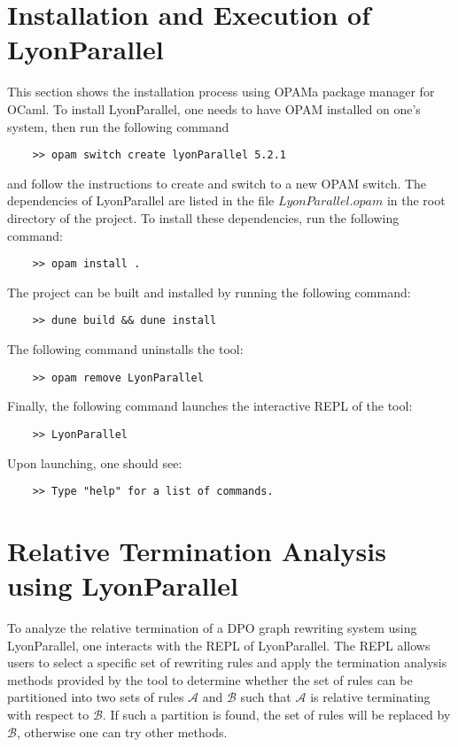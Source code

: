 \section{Installation and Execution of LyonParallel}
\label{lyonparallel:sec:installation}
This section shows the installation process using \colorbox{Ivory2}{OPAM}\textemdash a package manager for OCaml. To install LyonParallel, one needs to have \colorbox{Ivory2}{OPAM} installed on one's system, then 
run the following command
\begin{verbatim}
    >> opam switch create lyonParallel 5.2.1
\end{verbatim}
 and follow the instructions to create and switch to a new \colorbox{Ivory2}{OPAM} switch. 
 The dependencies of LyonParallel are listed in the file \colorbox{Ivory2}{$LyonParallel.opam$} in the root directory of the project. To install these dependencies, run the following command:
\begin{verbatim}
    >> opam install .
\end{verbatim}
The project can be built and installed by running the following command:
\begin{verbatim}
    >> dune build && dune install
\end{verbatim}
The following command uninstalls the tool:
\begin{verbatim}
    >> opam remove LyonParallel
\end{verbatim}
Finally, the following command launches the interactive REPL of the tool:
\begin{verbatim}
    >> LyonParallel
\end{verbatim}
Upon launching, one should see:
\begin{verbatim}
    >> Type "help" for a list of commands.
\end{verbatim}
\section{Relative Termination Analysis using LyonParallel}
\label{lyonparallel:sec:termination}
To analyze the relative termination of a DPO graph rewriting system using LyonParallel, one interacts with the REPL of LyonParallel. The REPL allows users to select a specific set of rewriting rules and apply the termination analysis methods provided by the tool to determine whether the set of rules can be partitioned into two sets of rules $\mathcal{A}$ and $\mathcal{B}$ such that $\mathcal{A}$ is relative terminating with respect to $\mathcal{B}$. If such a partition is found, the set of rules will be replaced by $\mathcal{B}$, otherwise one can try other methods.

